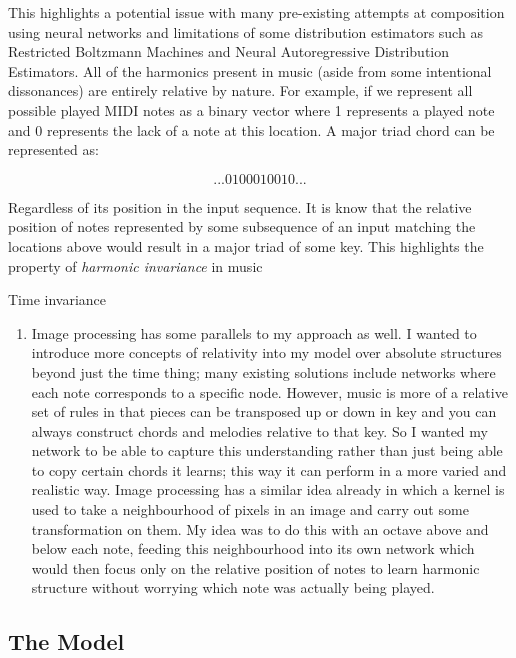 \documentclass[12pt,]{article}
\providecommand{\tightlist}{%
  \setlength{\itemsep}{0pt}\setlength{\parskip}{0pt}}
\begin{document}
This highlights a potential issue with many pre-existing attempts at
composition using neural networks and limitations of some distribution
estimators such as Restricted Boltzmann Machines and Neural
Autoregressive Distribution Estimators. All of the harmonics present in
music (aside from some intentional dissonances) are entirely relative by
nature. For example, if we represent all possible played MIDI notes as a
binary vector where 1 represents a played note and 0 represents the lack
of a note at this location. A major triad chord can be represented as:

\[... 0100010010 ...\]

Regardless of its position in the input sequence. It is know that the
relative position of notes represented by some subsequence of an input
matching the locations above would result in a major triad of some key.
This highlights the property of \emph{harmonic invariance} in music

Time invariance

\begin{enumerate}
\def\labelenumi{\arabic{enumi}.}
\setcounter{enumi}{4}
\tightlist
\item
  Image processing has some parallels to my approach as well. I wanted
  to introduce more concepts of relativity into my model over absolute
  structures beyond just the time thing; many existing solutions include
  networks where each note corresponds to a specific node. However,
  music is more of a relative set of rules in that pieces can be
  transposed up or down in key and you can always construct chords and
  melodies relative to that key. So I wanted my network to be able to
  capture this understanding rather than just being able to copy certain
  chords it learns; this way it can perform in a more varied and
  realistic way. Image processing has a similar idea already in which a
  kernel is used to take a neighbourhood of pixels in an image and carry
  out some transformation on them. My idea was to do this with an octave
  above and below each note, feeding this neighbourhood into its own
  network which would then focus only on the relative position of notes
  to learn harmonic structure without worrying which note was actually
  being played.
\end{enumerate}

\hypertarget{the-model}{%
\subsection{The Model}\label{the-model}}
\end{document}

